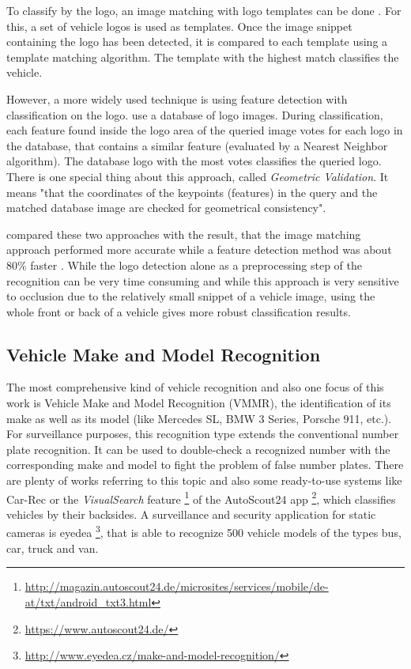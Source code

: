 To classify by the logo, an image matching with logo templates can be done \citep{jain2015car} \citep{wang2007fast}. For this, a set of vehicle logos is used as templates. Once the image snippet containing the logo has been detected, it is compared to each template using a template matching algorithm. The template with the highest match classifies the vehicle.

However, a more widely used technique is using feature detection with classification on the logo. \citeauthor{psyllos2010vehicle} use a database of logo images. During classification, each feature found inside the logo area of the queried image votes for each logo in the database, that contains a similar feature (evaluated by a Nearest Neighbor algorithm). The database logo with the most votes classifies the queried logo. There is one special thing about this approach, called \emph{Geometric Validation}. It means "that the coordinates of the keypoints (features) in the query and the matched database image are checked for geometrical consistency".

\citeauthor{rezaeivehicle} compared these two approaches with the result, that the image matching approach performed more accurate while a feature detection method was about 80\% faster \citep{rezaeivehicle}. While the logo detection alone as a preprocessing step of the recognition can be very time consuming \citep{siddiqui2015robust} and while this approach is very sensitive to occlusion due to the relatively small snippet of a vehicle image, using the whole front or back of a vehicle gives more robust classification results.

\subsection{Vehicle Make and Model Recognition}\label{sec:vmmrStateOfTheArt}
The most comprehensive kind of vehicle recognition and also one focus of this work is Vehicle Make and Model Recognition (VMMR), the identification of its make as well as its model (like Mercedes SL, BMW 3 Series, Porsche 911, etc.). For surveillance purposes, this recognition type extends the conventional number plate recognition. It can be used to double-check a recognized number with the corresponding make and model to fight the problem of false number plates. There are plenty of works referring to this topic and also some ready-to-use systems like Car-Rec \citep{jang2011car} or the \emph{VisualSearch} feature \footnote{\url{http://magazin.autoscout24.de/microsites/services/mobile/de-at/txt/android_txt3.html}} of the AutoScout24 app \footnote{\url{https://www.autoscout24.de/}}, which classifies vehicles by their backsides.
A surveillance and security application for static cameras is eyedea \footnote{\url{http://www.eyedea.cz/make-and-model-recognition/}}, that is able to recognize 500 vehicle models of the types bus, car, truck and van.

